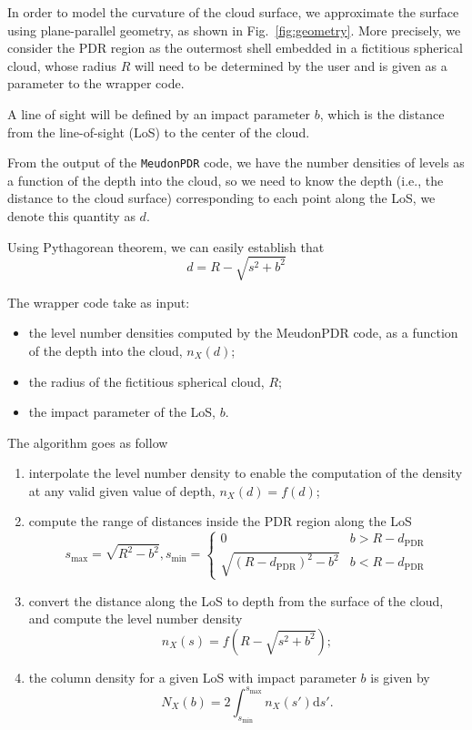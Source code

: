 \documentclass[12pt,a4paper]{article}
\newcommand{\mr}{\mathrm}
\newcommand{\dd}[1]{\mathrm{d}#1}
\newcommand{\mdpdr}{\texttt{MeudonPDR} code}
\begin{document}
In order to model the curvature of the cloud surface, we approximate the surface using plane-parallel geometry, as shown in Fig.~\ref{fig:geometry}. More precisely, we consider the PDR region as the outermost shell embedded in a fictitious spherical cloud, whose radius $R$ will need to be determined by the user and is given as a parameter to the wrapper code.

A line of sight will be defined by an impact parameter $b$, which is the distance from the line-of-sight (LoS) to the center of the cloud. 

From the output of the \mdpdr{}, we have the number densities of levels as a function of the depth into the cloud, so we need to know the depth (i.e., the distance to the cloud surface) corresponding to each point along the LoS, we denote this quantity as $d$.

Using Pythagorean theorem, we can easily establish that
\begin{equation}
    d = R - \sqrt{s^2 + b^2} 
\end{equation}

The wrapper code take as input:
\begin{itemize}
    \item the level number densities computed by the MeudonPDR code, as a function of the depth into the cloud, $n_X(d)$;
    \item the radius of the fictitious spherical cloud, $R$;
    \item the impact parameter of the LoS, $b$.
\end{itemize}
The algorithm goes as follow
\begin{enumerate}
    \item interpolate the level number density to enable the computation of the density at any valid given value of depth, $n_X(d) = f(d)$;
    \item compute the range of distances inside the PDR region along the LoS
    \begin{equation}
         s_{\max} = \sqrt{R^2 - b^2}, 
         s_{\min} = \left\{\begin{array}{ll}
            0  &  b > R - d_\mr{PDR} \\
            \sqrt{(R - d_\mr{PDR})^2 - b^2}  &  b < R - d_\mr{PDR}
         \end{array}\right.
    \end{equation}
    \item convert the distance along the LoS to depth from the surface of the cloud, and compute the level number density
    \begin{equation}
        n_X(s) = f(R - \sqrt{s^2 + b^2});
    \end{equation}
    \item the column density for a given LoS with impact parameter $b$ is given by
    \begin{equation}
        N_X(b) = 2\int_{s_{\min}}^{s_{\max}} n_X(s') \dd{s'}.
    \end{equation}
\end{enumerate}
\end{document}
